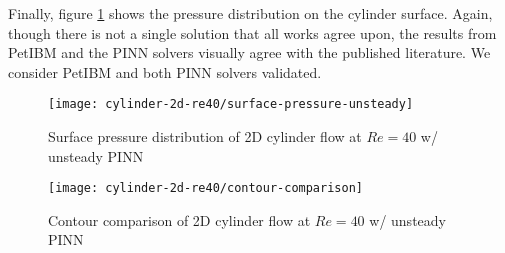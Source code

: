 Finally, figure \ref{fig:cylinder-re40-pinn-surfp} shows the pressure distribution on the cylinder surface.
Again, though there is not a single solution that all works agree upon, the results from PetIBM and the PINN solvers visually agree with the published literature.
We consider PetIBM and both PINN solvers validated.

\begin{figure}
    \centering%
    \texttt{[image: cylinder-2d-re40/surface-pressure-unsteady]}%
    \caption{%
        Surface pressure distribution of 2D cylinder flow at $Re=\num{40}$ w/ unsteady PINN
    }
    \label{fig:cylinder-re40-pinn-surfp}%
\end{figure}

\begin{figure*}
    \centering%
    \texttt{[image: cylinder-2d-re40/contour-comparison]}%
    \caption{%
        Contour comparison of 2D cylinder flow at $Re=\num{40}$ w/ unsteady PINN
    }
    \label{fig:cylinder-re40-contours}%
\end{figure*}

